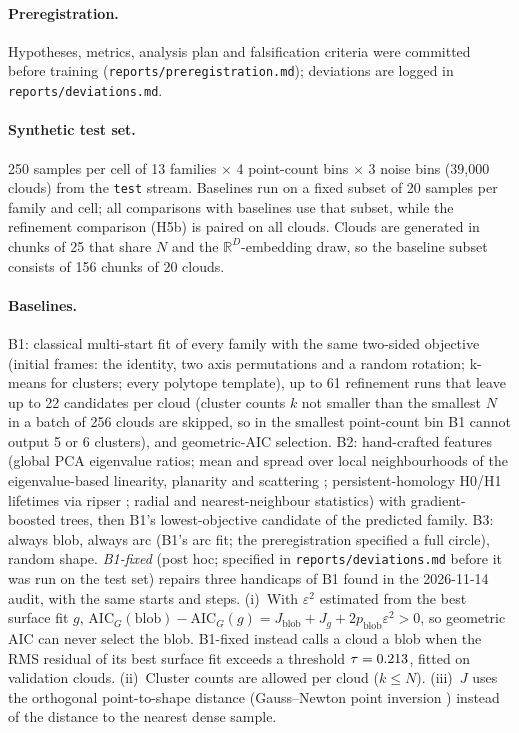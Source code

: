 \documentclass[10pt]{article}
\begin{document}
\paragraph{Preregistration.} Hypotheses, metrics, analysis plan and falsification criteria were committed before training (\texttt{reports/preregistration.md}); deviations are logged in \texttt{reports/deviations.md}.
\paragraph{Synthetic test set.} 250 samples per cell of 13 families $\times$ 4 point-count bins $\times$ 3 noise bins (39{,}000 clouds) from the \texttt{test} stream. Baselines run on a fixed subset of 20 samples per family and cell; all comparisons with baselines use that subset, while the refinement comparison (H5b) is paired on all \nMethod{} clouds. Clouds are generated in chunks of 25 that share $N$ and the $\mathbb{R}^D$-embedding draw, so the baseline subset consists of 156 chunks of 20 clouds.
\paragraph{Baselines.} B1: classical multi-start fit of every family with the same two-sided objective (initial frames: the identity, two axis permutations and a random rotation; k-means for clusters; every polytope template), up to 61 refinement runs that leave up to 22 candidates per cloud (cluster counts $k$ not smaller than the smallest $N$ in a batch of 256 clouds are skipped, so in the smallest point-count bin B1 cannot output 5 or 6 clusters), and geometric-AIC selection. B2: hand-crafted features (global PCA eigenvalue ratios; mean and spread over local neighbourhoods of the eigenvalue-based linearity, planarity and scattering \citep{weinmann2014features,weinmann2015features}; persistent-homology H0/H1 lifetimes via ripser \citep{tralie2018ripser}; radial and nearest-neighbour statistics) with gradient-boosted trees, then B1's lowest-objective candidate of the predicted family. B3: always blob, always arc (B1's arc fit; the preregistration specified a full circle), random shape. \emph{B1-fixed} (post hoc; specified in \texttt{reports/deviations.md} before it was run on the test set) repairs three handicaps of B1 found in the 2026-11-14 audit, with the same starts and steps. (i)~With $\varepsilon^2$ estimated from the best surface fit $g$, $\mathrm{AIC}_G(\text{blob}) - \mathrm{AIC}_G(g) = J_\text{blob} + J_g + 2p_\text{blob}\varepsilon^2 > 0$, so geometric AIC can never select the blob. B1-fixed instead calls a cloud a blob when the RMS residual of its best surface fit exceeds a threshold $\tau=0.213{}$, fitted on \bonefixedNval{} validation clouds. (ii)~Cluster counts are allowed per cloud ($k \le N$). (iii)~$J$ uses the orthogonal point-to-shape distance (Gauss--Newton point inversion \citep{ma2003inversion,hu2005projection}) instead of the distance to the nearest dense sample.
\end{document}
